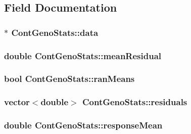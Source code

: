 \subsection{Field Documentation}
\hypertarget{classContGenoStats_a3e0477a12dd35807fa4e1335d8119a5d}{
\subsubsection[{data}]{$\ast$ {\bf ContGenoStats::data}}}
\label{classContGenoStats_a3e0477a12dd35807fa4e1335d8119a5d}
\hypertarget{classContGenoStats_a7dca7abc1d8302920600dd40a892b249}{
\subsubsection[{meanResidual}]{\setlength{\rightskip}{0pt plus 5cm}double {\bf ContGenoStats::meanResidual}}}
\label{classContGenoStats_a7dca7abc1d8302920600dd40a892b249}
\hypertarget{classContGenoStats_ad1e33f4b7b4137273099df0d7dcbdb4d}{
\subsubsection[{ranMeans}]{\setlength{\rightskip}{0pt plus 5cm}bool {\bf ContGenoStats::ranMeans}}}
\label{classContGenoStats_ad1e33f4b7b4137273099df0d7dcbdb4d}
\hypertarget{classContGenoStats_ace549196ed683fba9cd205a240ec552b}{
\subsubsection[{residuals}]{\setlength{\rightskip}{0pt plus 5cm}vector$<$double$>$ {\bf ContGenoStats::residuals}}}
\label{classContGenoStats_ace549196ed683fba9cd205a240ec552b}
\hypertarget{classContGenoStats_acc4ad5538332d2b491c5526145a49fbe}{
\subsubsection[{responseMean}]{\setlength{\rightskip}{0pt plus 5cm}double {\bf ContGenoStats::responseMean}}}
\label{classContGenoStats_acc4ad5538332d2b491c5526145a49fbe}


